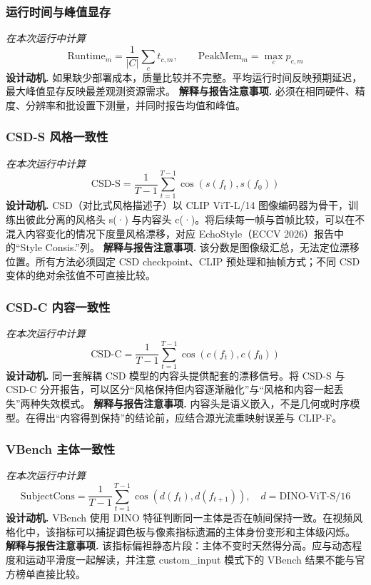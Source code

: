\documentclass[UTF8,10pt]{ctexart}
\begin{document}
\subsubsection*{运行时间与峰值显存}
\textit{在本次运行中计算}
\begin{equation*}
\mathrm{Runtime}_m=\frac{1}{|C|}\sum_c t_{c,m},\qquad \mathrm{PeakMem}_m=\max_c p_{c,m}
\end{equation*}
\textbf{设计动机.} 如果缺少部署成本，质量比较并不完整。平均运行时间反映预期延迟，最大峰值显存反映最差观测资源需求。
\textbf{解释与报告注意事项.} 必须在相同硬件、精度、分辨率和批设置下测量，并同时报告均值和峰值。
\subsubsection*{CSD-S 风格一致性}
\textit{在本次运行中计算}
\begin{equation*}
\mathrm{CSD\text{-}S}=\frac{1}{T-1}\sum_{t=1}^{T-1}\cos\!\left(s(f_t),s(f_0)\right)
\end{equation*}
\textbf{设计动机.} CSD（对比式风格描述子）以 CLIP ViT-L/14 图像编码器为骨干，训练出彼此分离的风格头 s(·) 与内容头 c(·)。将后续每一帧与首帧比较，可以在不混入内容变化的情况下度量风格漂移，对应 EchoStyle（ECCV 2026）报告中的“Style Consis.”列。
\textbf{解释与报告注意事项.} 该分数是图像级汇总，无法定位漂移位置。所有方法必须固定 CSD checkpoint、CLIP 预处理和抽帧方式；不同 CSD 变体的绝对余弦值不可直接比较。
\subsubsection*{CSD-C 内容一致性}
\textit{在本次运行中计算}
\begin{equation*}
\mathrm{CSD\text{-}C}=\frac{1}{T-1}\sum_{t=1}^{T-1}\cos\!\left(c(f_t),c(f_0)\right)
\end{equation*}
\textbf{设计动机.} 同一套解耦 CSD 模型的内容头提供配套的漂移信号。将 CSD-S 与 CSD-C 分开报告，可以区分“风格保持但内容逐渐融化”与“风格和内容一起丢失”两种失效模式。
\textbf{解释与报告注意事项.} 内容头是语义嵌入，不是几何或时序模型。在得出“内容得到保持”的结论前，应结合源光流重映射误差与 CLIP-F。
\subsubsection*{VBench 主体一致性}
\textit{在本次运行中计算}
\begin{equation*}
\mathrm{SubjectCons}=\frac{1}{T-1}\sum_{t=1}^{T-1}\cos\!\left(d(f_t),d(f_{t+1})\right),\quad d=\mathrm{DINO\text{-}ViT\text{-}S/16}
\end{equation*}
\textbf{设计动机.} VBench 使用 DINO 特征判断同一主体是否在帧间保持一致。在视频风格化中，该指标可以捕捉调色板与像素指标遗漏的主体身份变形和主体级闪烁。
\textbf{解释与报告注意事项.} 该指标偏袒静态片段：主体不变时天然得分高。应与动态程度和运动平滑度一起解读，并注意 custom\_input 模式下的 VBench 结果不能与官方榜单直接比较。
\end{document}
